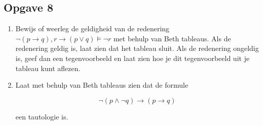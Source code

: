 \documentclass[11pt]{article}
\begin{document}
\subsection*{Opgave 8}
\begin{enumerate}[label=\alph*]

	\item Bewijs of weerleg de geldigheid van de redenering $\neg(p\rightarrow q), r\rightarrow(p\vee q) \models \neg r$ met behulp van Beth tableaus. Als de redenering geldig is, laat zien dat het tableau sluit. Als de redenering ongeldig is, geef dan een tegenvoorbeeld en laat zien hoe je dit tegenvoorbeeld uit je tableau kunt aflezen.

	\item Laat met behulp van Beth tableaus zien dat de formule

		\[\neg(p\wedge\neg q) \rightarrow (p \rightarrow q)\]

		een tautologie is.

\end{enumerate}
\end{document}
